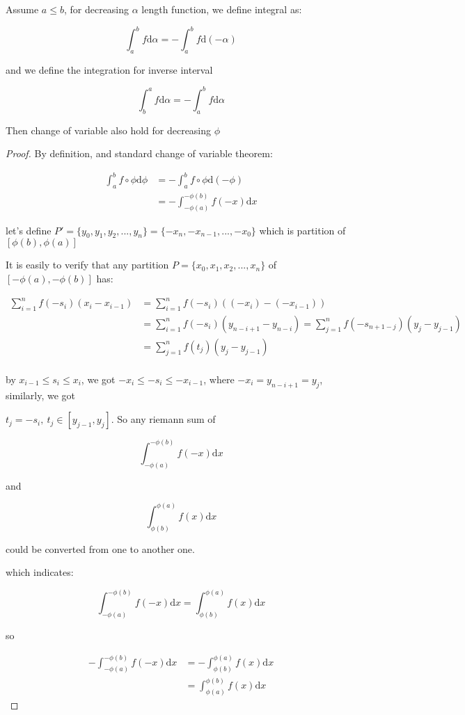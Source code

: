 \begin{thm}
    Assume $a \le b$, for decreasing $\alpha$ length function, we define integral as:

    \[
        \int_a^b f \mathrm{d} \alpha = -\int_a^b f \mathrm{d} \left(-\alpha \right)
    \]

    and we define the integration for inverse interval

    \[
        \int_b^a f \mathrm{d} \alpha = -\int_a^b f \mathrm{d} \alpha
    \]

    Then change of variable also hold for decreasing $\phi$
\end{thm}

\begin{proof}
    By definition, and standard change of variable theorem:

    \begin{align*}
        \int_a^b f \circ \phi \mathrm{d} \phi &= -\int_a^b f \circ \phi \mathrm{d} \left(-\phi \right) \\
        &= -\int_{-\phi(a)}^{-\phi(b)} f(-x) \mathrm{d} x
    \end{align*}


    let's define $P' = \{ y_0,y_1,y_2,...,y_n\} = \{ -x_n,-x_{n-1},...,-x_0\}$ which
    is partition of $[\phi(b), \phi(a)]$

    It is easily to verify that any partition $P=\{ x_0,x_1,x_2,...,x_n\}$ of $[-\phi(a), -\phi(b)]$ has:

    \begin{align*}
        \sum_{i=1}^{n} f(-s_i) (x_i - x_{i-1}) &= \sum_{i=1}^{n}f(-s_i)((-x_i) -(-x_{i-1})) \\
        &=  \sum_{i=1}^{n}f(-s_i)(y_{n-i+1} -y_{n-i}) = \sum_{j=1}^{n}f(-s_{n+1-j})(y_{j} -y_{j-1}) \\
        &=  \sum_{j=1}^{n}f(t_j)(y_{j} -y_{j-1}) \\
    \end{align*}

    by $x_{i-1} \le s_i \le x_i$, we got $-x_i \le -s_i \le -x_{i-1}$, where $-x_i = y_{n-i+1} = y_j$, similarly, we got

    $t_j = -s_i,\: t_j \in[y_{j-1}, y_j]$. So any riemann sum of 

    \[
\int_{-\phi(a)}^{-\phi(b)} f(-x) \mathrm{d} x
    \]

    and

    \[
\int_{\phi(b)}^{\phi(a)} f(x) \mathrm{d} x
    \]

    could be converted from one to another one.

    which indicates:

    \[
        \int_{-\phi(a)}^{-\phi(b)} f(-x) \mathrm{d} x = \int_{\phi(b)}^{\phi(a)} f(x) \mathrm{d} x
    \]

    so 

    \begin{align*}
        -\int_{-\phi(a)}^{-\phi(b)} f(-x) \mathrm{d} x &= -\int_{\phi(b)}^{\phi(a)} f(x) \mathrm{d} x \\
        &= \int_{\phi(a)}^{\phi(b)} f(x) \mathrm{d} x
    \end{align*}
\end{proof}

